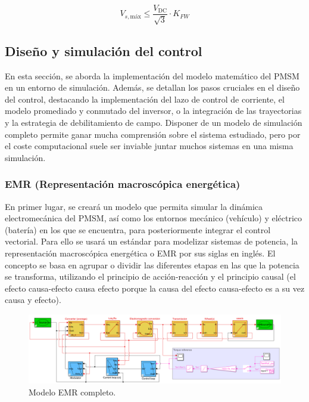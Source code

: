 \begin{equation}
	V_{s,\text{máx}} \leq \frac{V_{\text{DC}}}{\sqrt{3}}\cdot K_{FW}
\end{equation}

\subsection{Diseño y simulación del control}

En esta sección, se aborda la implementación del modelo matemático del PMSM en un entorno de simulación. Además, se detallan los pasos cruciales en el diseño del control, destacando la implementación del lazo de control de corriente, el modelo promediado y conmutado del inversor, o la integración de las trayectorias y la estrategia de debilitamiento de campo. Disponer de un modelo de simulación completo permite ganar mucha comprensión sobre el sistema estudiado, pero por el coste computacional suele ser inviable juntar muchos sistemas en una misma simulación.

\subsubsection{EMR (Representación macroscópica energética)}
En primer lugar, se creará un modelo que permita simular la dinámica electromecánica del PMSM, así como los entornos mecánico (vehículo) y eléctrico (batería) en los que se encuentra, para posteriormente integrar el control vectorial. Para ello se usará un estándar para modelizar sistemas de potencia, la representación macroscópica energética o EMR por sus siglas en inglés. El concepto se basa en agrupar o dividir las diferentes etapas en las que la potencia se transforma, utilizando el principio de acción-reacción y el principio causal (el efecto causa-efecto causa efecto porque la causa del efecto causa-efecto es a su vez causa y efecto). 


\begin{figure}[H]
	\centering
	\includegraphics[width=1\linewidth]{fig/EMR_FULL.png}
	\caption{Modelo EMR completo.}
\end{figure}

